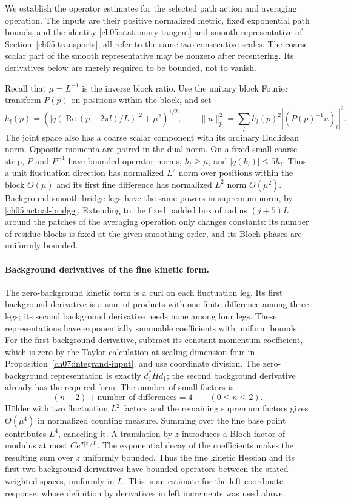 We establish the operator estimates for the selected path action and
averaging operation. The inputs are their positive normalized metric, fixed
exponential path bounds, and the identity \eqref{ch05:stationary-tangent} and smooth
representative of Section~\ref{ch05:transports}; all refer to the same
two consecutive scales. The coarse scalar part of the smooth representative
may be nonzero after recentering. Its derivatives below are merely
required to be bounded, not to vanish.

Recall that $\mu=L^{-1}$ is the inverse block ratio. Use the unitary
block Fourier transform $P(p)$ on positions within the block, and set
\[
 h_l(p)=(|q(\operatorname{Re}(p+2\pi l)/L)|^2+\mu^2)^{1/2},
 \qquad
 \|u\|_{p}^2=\sum_l h_l(p)^2|(P(p)^{-1}u)_l|^2.
\]
The joint space also has a coarse scalar component with its ordinary
Euclidean norm. Opposite momenta are paired in the dual norm.
On a fixed small coarse strip, $P$ and $P^{-1}$ have bounded operator
norms, $h_l\ge\mu$, and $|q(k_l)|\le5h_l$.
Thus a unit fluctuation direction has normalized $L^2$ norm over positions within the block
$O(\mu)$ and its first fine difference has normalized $L^2$ norm
$O(\mu^2)$. Background smooth bridge legs have the same powers in
supremum norm, by \eqref{ch05:actual-bridge}. Extending to the fixed
padded box of radius $(j+5)L$ around the patches of the averaging operation only changes constants: its number of residue
blocks is fixed at the given smoothing order, and its Bloch phases
are uniformly bounded.

\paragraph{Background derivatives of the fine kinetic form.}
The zero-background kinetic form is a curl on each fluctuation leg.
Its first background derivative is a sum of products with one finite
difference among three legs; its second background derivative needs none among
four legs. These representations have exponentially summable
coefficients with uniform bounds. For the first background derivative, subtract
its constant momentum coefficient, which is zero by the
Taylor calculation at scaling dimension four in Proposition~\ref{ch07:integrand-input}, and use
coordinate division. The zero-background representation is exactly
$d_1^*Hd_1$; the second background derivative already has the required form.
The number of small factors is
\[
 (n+2)+\text{number of differences}=4\qquad(0\le n\le2).
\]
H\"older with two fluctuation $L^2$ factors and the remaining supremum
factors gives $O(\mu^4)$ in normalized counting measure. Summing over the
fine base point contributes $L^4$, canceling it. A translation by $z$ introduces a
Bloch factor of modulus at most $C e^{\sigma|z|/L}$. The exponential
decay of the coefficients makes the resulting sum over $z$ uniformly bounded. Thus the fine kinetic Hessian and its first two
background derivatives have bounded operators between the stated
weighted spaces, uniformly in $L$. This is an estimate for the
left-coordinate response, whose definition by derivatives in left increments was used above.

